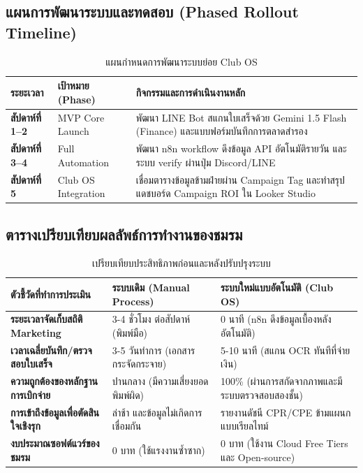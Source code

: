 \documentclass[10pt,a4paper]{article}
\begin{document}
\subsection{แผนการพัฒนาระบบและทดสอบ (Phased Rollout Timeline)}
\begin{table}[h!]
  \centering
  \caption{\chulafont แผนกำหนดการพัฒนาระบบย่อย Club OS}
  \begin{tabular}{llp{11.0cm}}
    \toprule
    \textbf{ระยะเวลา} & \textbf{เป้าหมาย (Phase)} & \textbf{กิจกรรมและการดำเนินงานหลัก} \\
    \midrule
    \textbf{สัปดาห์ที่ 1--2} & MVP Core Launch & พัฒนา LINE Bot สแกนใบเสร็จด้วย Gemini 1.5 Flash (Finance) และแบบฟอร์มบันทึกการตลาดสำรอง \\
    \textbf{สัปดาห์ที่ 3--4} & Full Automation & พัฒนา n8n workflow ดึงข้อมูล API อัตโนมัติรายวัน และระบบ verify ผ่านปุ่ม Discord/LINE \\
    \textbf{สัปดาห์ที่ 5} & Club OS Integration & เชื่อมตารางข้อมูลข้ามฝ่ายผ่าน Campaign Tag และทำสรุปแดชบอร์ด Campaign ROI ใน Looker Studio \\
    \bottomrule
  \end{tabular}
\end{table}

\subsection{ตารางเปรียบเทียบผลลัพธ์การทำงานของชมรม}
\begin{table}[h!]
  \centering
  \caption{\chulafont เปรียบเทียบประสิทธิภาพก่อนและหลังปรับปรุงระบบ}
  \begin{tabular}{lll}
    \toprule
    \textbf{ตัวชี้วัดที่ทำการประเมิน} & \textbf{ระบบเดิม (Manual Process)} & \textbf{ระบบใหม่แบบอัตโนมัติ (Club OS)} \\
    \midrule
    \textbf{ระยะเวลาจัดเก็บสถิติ Marketing} & 3-4 ชั่วโมง ต่อสัปดาห์ (พิมพ์มือ) & 0 นาที (n8n ดึงข้อมูลเบื้องหลังอัตโนมัติ) \\
    \textbf{เวลาเฉลี่ยบันทึก/ตรวจสอบใบเสร็จ} & 3-5 วันทำการ (เอกสารกระจัดกระจาย) & 5-10 นาที (สแกน OCR ทันทีที่จ่ายเงิน) \\
    \textbf{ความถูกต้องของหลักฐานการเบิกจ่าย} & ปานกลาง (มีความเสี่ยงยอดพิมพ์ผิด) & 100\% (ผ่านการสกัดจากภาพและมีระบบตรวจสอบสองชั้น) \\
    \textbf{การเข้าถึงข้อมูลเพื่อตัดสินใจเชิงรุก} & ล่าช้า และข้อมูลไม่เกิดการเชื่อมกัน & รายงานดัชนี CPR/CPE ข้ามแผนกแบบเรียลไทม์ \\
    \textbf{งบประมาณซอฟต์แวร์ของชมรม} & 0 บาท (ใช้แรงงานซ้ำซาก) & 0 บาท (ใช้งาน Cloud Free Tiers และ Open-source) \\
    \bottomrule
  \end{tabular}
\end{table}
\end{document}
